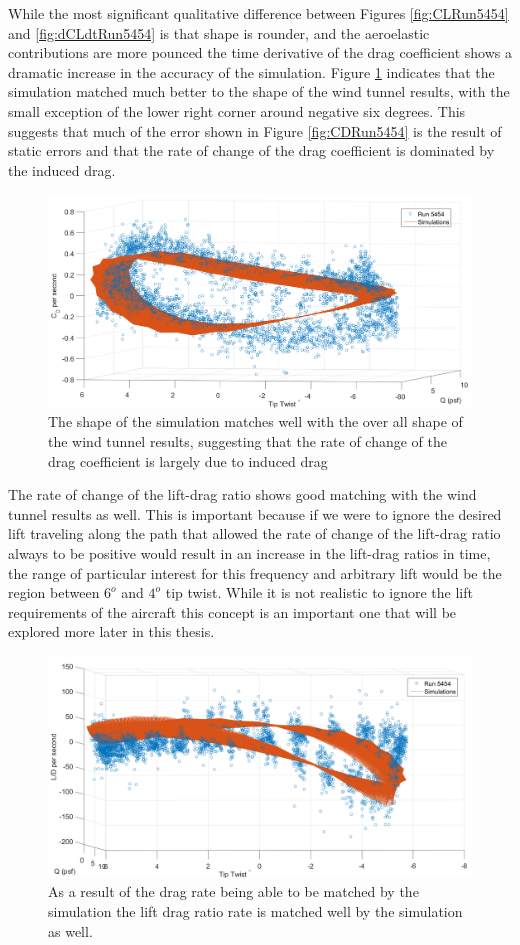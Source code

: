 \documentclass[11pt]{ucthesis}
\begin{document}
While the most significant qualitative difference between Figures \ref{fig:CLRun5454} and \ref{fig:dCLdtRun5454} is that shape is rounder, and the aeroelastic contributions are more pounced the time derivative of the drag coefficient shows a dramatic increase in the accuracy of the simulation. Figure \ref{fig:dCDdtRun5454} indicates that the simulation matched much better to the shape of the wind tunnel results, with the small exception of the lower right corner around negative six degrees. This suggests that much of the error shown in Figure \ref{fig:CDRun5454} is the result of static errors and that the rate of change of the drag coefficient is dominated by the induced drag.

\begin{figure}[thpb]
\centering
\includegraphics[width=.75\linewidth]{Figures/diffCD5454.png}
\caption{The shape of the simulation matches well with the over all shape of the wind tunnel results, suggesting that the rate of change of the drag coefficient is largely due to induced drag}
\label{fig:dCDdtRun5454}
\end{figure}

The rate of change of the lift-drag ratio shows good matching with the wind tunnel results as well. This is important because if we were to ignore the desired lift traveling along the path that allowed the rate of change of the lift-drag ratio always to be positive would result in an increase in the lift-drag ratios in time, the range of particular interest for this frequency and arbitrary lift would be the region between $6^o$ and $4^o$ tip twist. While it is not realistic to ignore the lift requirements of the aircraft this concept is an important one that will be explored more later in this thesis.

\begin{figure}[thpb]
\centering
\includegraphics[width=.75\linewidth]{Figures/diffLD5454.png}
\caption{As a result of the drag rate being able to be matched by the simulation the lift drag ratio rate is matched well by the simulation as well.}
\label{fig:dLDdtRun5454}
\end{figure}
\end{document}
